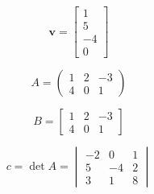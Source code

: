 \documentclass{article}
\begin{document}
\section{   }
        
\begin{equation}
{\mathbf v} = \begin{bmatrix}1 \\ 5 \\ -4 \\ 0\end{bmatrix}
\end{equation}

\begin{equation}
A = \begin{pmatrix}1 & 2 & -3 \\ 4 & 0 & 1\end{pmatrix}
\end{equation}

\begin{equation}
B = \begin{bmatrix}1 & 2 & -3 \\ 4 & 0 & 1\end{bmatrix}
\end{equation}

\begin{equation}
c = \det A = \begin{vmatrix}-2 & 0 & 1 \\ 5 & -4 & 2 \\ 3 & 1 & 8\end{vmatrix}
\end{equation}
\end{document}
